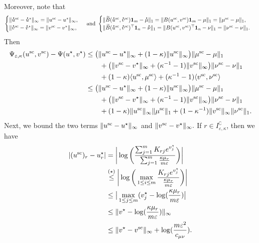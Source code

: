 Moreover, note that 
\begin{align*}
\begin{cases}
\norm{\dt{u}^{\text{sc}} - \dt{u}^\star}_\infty = \norm{{u}^{\text{sc}} - {u}^\star}_\infty,\\
\norm{\dt{v}^{\text{sc}} - \dt{v}^\star}_\infty = \norm{{v}^{\text{sc}} - {v}^\star}_\infty,
\end{cases}
\text{ and }
\begin{cases}
\norm{\widetilde{B}(\dt{u}^{\text{sc}} ,\dt{v}^{\text{sc}})\mathbf 1_m - \dt{\mu}}_1 = \norm{{B}({u}^{\text{sc}} ,{v}^{\text{sc}})\mathbf 1_m - {\mu}}_1 = \norm{\mu^{\text{sc}} - \mu}_1,\\
\norm{\widetilde{B}(\dt{u}^{\text{sc}} ,\dt{v}^{\text{sc}})^\top\mathbf 1_n - \dt{\nu}}_1 = \norm{{B}({u}^{\text{sc}} ,{v}^{\text{sc}})^\top\mathbf 1_n - {\nu}}_1 = \norm{\nu^{\text{sc}} - \nu}_1.
\end{cases}
\end{align*}
Then
\begin{align}
\Psi_{\varepsilon, \kappa}(u^{\text{sc}} ,v^{\text{sc}}) -\Psi(u^\star, v^\star) &
\leq \big(\|{u}^{\text{sc}} - {u}^\star\|_\infty + (1- \kappa) \|{u}^{\text{sc}}\|_\infty\big)\|\mu^{\text{sc}} - \mu\|_1\nonumber\\
&\qquad + \big(\|{v}^{\text{sc}} - {v}^\star\|_\infty + (\kappa^{-1} - 1) \|{v}^{\text{sc}}\|_\infty\big) \|\nu^{\text{sc}} - \nu\|_1\nonumber\\
&\qquad + (1- \kappa)\langle {u}^{\text{sc}} ,{\mu}^{\text{sc}} \rangle + (\kappa^{-1} -1)\langle {v}^{\text{sc}} ,{\nu}^{\text{sc}} \rangle\nonumber\\
&\leq \big(\|{u}^{\text{sc}} - {u}^\star\|_\infty + (1- \kappa) \|{u}^{\text{sc}}\|_\infty\big)\|\mu^{\text{sc}} - \mu\|_1\nonumber\\
&\qquad + \big(\|{v}^{\text{sc}} - {v}^\star\|_\infty + (\kappa^{-1} - 1) \|{v}^{\text{sc}}\|_\infty\big) \|\nu^{\text{sc}} - \nu\|_1 \label{priori_bounds_induction}\\
&\qquad + (1- \kappa)\|{u}^{\text{sc}}\|_\infty\|{\mu}^{\text{sc}}\|_1 + (1- \kappa^{-1})\|{v}^{\text{sc}}\|_\infty\|{\nu}^{\text{sc}}\|_1.\nonumber
\end{align}
Next, we bound the two terms $\|{u}^{\textrm{sc}} - {u}^\star\|_\infty $ and $\|{v}^{\text{sc}} - {v}^\star\|_\infty.$
If $r \in I^\complement_{\varepsilon, \kappa}$, then we have 
\begin{align*}
|({u}^{\text{sc}})_{r} - {u}^\star_r| 
&= \bigg|\log\bigg(\frac{\sum_{j=1}^m K_{rj}e^{v^\star_j}}{\sum_{j=1}^m \frac{\kappa \mu_r}{m\varepsilon}}\bigg) \bigg|\\
& \overset{(\star)}{\leq} \bigg|\log\bigg(\max_{1\leq i \leq m} \frac{K_{rj}e^{v^\star_j}}{\frac{\kappa \mu_r}{m\varepsilon}}\bigg) \bigg|\\
& \leq \big|\max_{1\leq j \leq m} (v_j^\star - \log(\frac{\kappa \mu_r}{m\varepsilon})\big|\\
& \leq \|v^\star - \log(\frac{\kappa \mu_r}{m\varepsilon})\|_\infty \\
& \leq \|v^\star - {v}^{\text{sc}}\|_\infty + \log(\frac{m\varepsilon^2}{c_{\mu\nu}}).
\end{align*}
